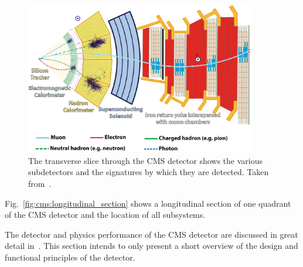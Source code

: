 \begin{figure}[htp]
    \centering
    \includegraphics[width=0.9\textwidth]{figures/cms_detector/cms_slice.png}
    \caption[Transverse slice of the CMS detector]{The transverse slice through the
        CMS detector shows the various subdetectors and the signatures by which
        they are detected. Taken from~\cite{Barney:2120661}.}
    \label{fig:cms:transverse_slice}
\end{figure}


Fig.~\ref{fig:cms:longitudinal_section} shows a longitudinal section of one
quadrant of the CMS detector and the location of all subsystems.

The detector and physics performance of the CMS detector are discussed in great
detail in~\cite{Bayatian:922757,Ball:2007zza,Chatrchyan:2008aa}. This section
intends to only present a short overview of the design and functional principles
of the detector.

